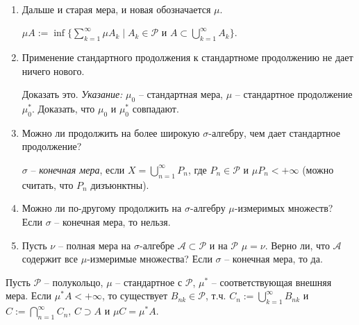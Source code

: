 \begin{remark}~
    \begin{enumerate}
        \item Дальше и старая мера, и новая обозначается $\mu$.
        
        $\mu A:=\inf \{\sum\limits_{k=1}^\infty \mu A_k\mid A_k\in \mathcal{P}\text{ и } A\subset \bigcup\limits_{k=1}^\infty A_k\}$.

        \item Применение стандартного продолжения к стандартноме продолжению не дает ничего нового.

        \begin{exercise}
            Доказать это. \textit{Указание:} $\mu_0$ – стандартная мера, $\mu$ – стандартное продолжение $\mu_0^*$. 
            Доказать, что $\mu_0$ и $\mu_0^*$ совпадают.
        \end{exercise}
        
        \item Можно ли продолжить на более широкую $\sigma$-алгебру, чем дает стандартное продолжение?
        
        \begin{definition}
            $\sigma$ – \textit{конечная мера}, если $X=\bigcup\limits_{n=1}^\infty P_n$, где $P_n\in \mathcal{P}$ и 
            $\mu P_n <+\infty$ (можно считать, что $P_n$ дизъюнктны).
        \end{definition}
        
        \item Можно ли по-другому продолжить на $\sigma$-алгебру $\mu$-измеримых множеств?
        Если $\sigma$ – конечная мера, то нельзя.

        \item Пусть $\nu$ – полная мера на $\sigma$-алгебре $\mathcal{A}\subset \mathcal{P}$ и на $\mathcal{P}$ $\mu=\nu$.
        Верно ли, что $\mathcal{A}$ содержит все $\mu$-измеримые множества? 
        Если $\sigma$ – конечная мера, то да.
    \end{enumerate}
\end{remark}

\begin{theorem}
    Пусть $\mathcal{P}$ – полукольцо, $\mu$ – стандартное с $\mathcal{P}$, $\mu^*$ – соответствующая внешняя мера.
    Если $\mu^* A<+\infty$, то существует $B_{nk}\in \mathcal{P}$, т.ч. $C_n:=\bigcup\limits_{k=1}^\infty B_{nk}$ и 
    $C:=\bigcap\limits_{n=1}^\infty C_n$, $C\supset A$ и $\mu C=\mu^* A$.
\end{theorem}

